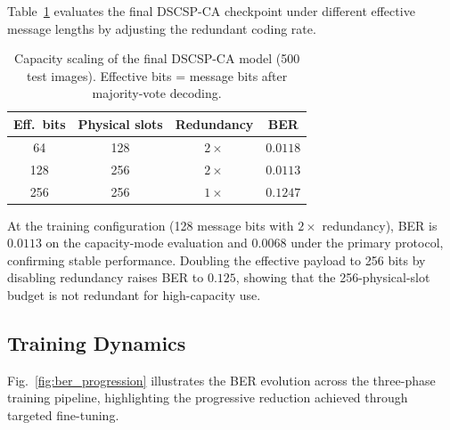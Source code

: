 \documentclass[journal]{IEEEtran}
\begin{document}
Table~\ref{tab:capacity} evaluates the final DSCSP-CA checkpoint under different effective
message lengths by adjusting the redundant coding rate.

\begin{table}[t]
\centering
\caption{Capacity scaling of the final DSCSP-CA model (500 test images).
         Effective bits = message bits after majority-vote decoding.}
\label{tab:capacity}
\small
\begin{tabular}{@{}cccc@{}}
\toprule
\textbf{Eff.\ bits} & \textbf{Physical slots} & \textbf{Redundancy} & \textbf{BER} \\
\midrule
64  & 128 & $2\times$ & $0.0118$ \\
128 & 256 & $2\times$ & $0.0113$ \\
256 & 256 & $1\times$ & $0.1247$ \\
\bottomrule
\end{tabular}
\end{table}

At the training configuration (128 message bits with $2\times$ redundancy), BER is $0.0113$
on the capacity-mode evaluation and $0.0068$ under the primary protocol, confirming stable
performance.
Doubling the effective payload to 256 bits by disabling redundancy raises BER to $0.125$,
showing that the 256-physical-slot budget is not redundant for high-capacity use.

\subsection{Training Dynamics}
\label{sec:dynamics}

Fig.~\ref{fig:ber_progression} illustrates the BER evolution across the three-phase training
pipeline, highlighting the progressive reduction achieved through targeted fine-tuning.
\end{document}
